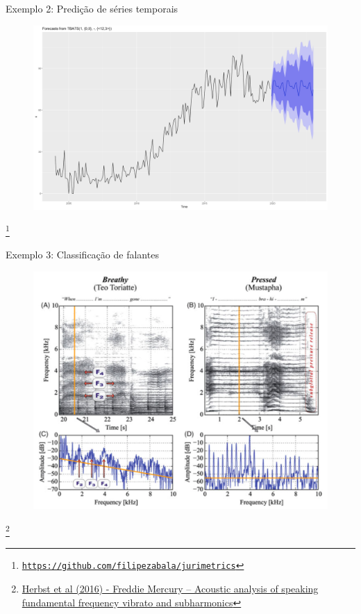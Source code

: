 \documentclass{beamer}
\newcommand\blfootnote[1]{%
  \begingroup
  \renewcommand\thefootnote{}\footnote{#1}%
  \addtocounter{footnote}{-1}%
  \endgroup
}
\begin{document}
\begin{frame}{Exemplo 2: Predição de séries temporais}
\begin{figure}
\includegraphics[scale=0.2]{forecast}
\end{figure}
\blfootnote{\tiny{\href{https://github.com/filipezabala/jurimetrics}{\nolinkurl{https://github.com/filipezabala/jurimetrics}}}}
\end{frame}

\begin{frame}{Exemplo 3: Classificação de falantes}
\begin{figure}
\includegraphics[scale=0.23]{freddie}
\end{figure}
\blfootnote{\tiny{\href{https://www.tandfonline.com/doi/abs/10.3109/14015439.2016.1156737}{Herbst et al (2016) - Freddie Mercury – Acoustic analysis of speaking fundamental frequency vibrato and subharmonics}}}
\end{frame}
\end{document}
